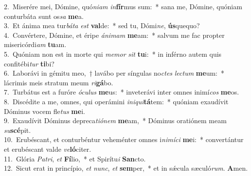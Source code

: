 {2.~}Miserére mei, Dómine, quó\textit{ni}\textit{am} \textit{in}\textbf{fír}mus sum:~* sana me, Dómine, quóniam conturbáta sunt os\textit{sa} \textbf{me}a.\\
{3.~}Et ánima mea tur\textit{bá}\textit{ta} \textit{est} \textbf{val}de:~* sed tu, Dómi\textit{ne}, \textbf{ús}quequo?\\
{4.~}Convértere, Dómine, et éripe \textit{á}\textit{ni}\textit{mam} \textbf{me}am:~* salvum me fac propter misericórdi\textit{am} \textbf{tu}am.\\
{5.~}Quóniam non est in morte qui \textit{me}\textit{mor} \textit{sit} \textbf{tu}i:~* in inférno autem quis confitébi\textit{tur} \textbf{ti}bi?\\
{6.~}Laborávi in gémitu meo,~† lavábo per síngulas no\textit{ctes} \textit{le}\textit{ctum} \textbf{me}um:~* lácrimis meis stratum meum \textit{ri}\textbf{gá}bo.\\
{7.~}Turbátus est a furóre \textit{ó}\textit{cu}\textit{lus} \textbf{me}us:~* inveterávi inter omnes inimí\textit{cos} \textbf{me}os.\\
{8.~}Discédite a me, omnes, qui operámini \textit{i}\textit{ni}\textit{qui}\textbf{tá}tem:~* quóniam exaudívit Dóminus vocem fle\textit{tus} \textbf{me}i.\\
{9.~}Exaudívit Dóminus depreca\textit{ti}\textit{ó}\textit{nem} \textbf{me}am,~* Dóminus oratiónem meam \textit{su}\textbf{scé}pit.\\
{10.~}Erubéscant, et conturbéntur veheménter omnes i\textit{ni}\textit{mí}\textit{ci} \textbf{me}i:~* convertántur et erubéscant valde \textit{ve}\textbf{ló}citer.\\
{11.~}Glória \textit{Pa}\textit{tri}, \textit{et} \textbf{Fí}lio,~* et Spirítu\textit{i} \textbf{San}cto.\\
{12.~}Sicut erat in princípio, \textit{et} \textit{nunc}, \textit{et} \textbf{sem}per,~* et in sǽcula sæculó\textit{rum}. \textbf{A}men.\\
